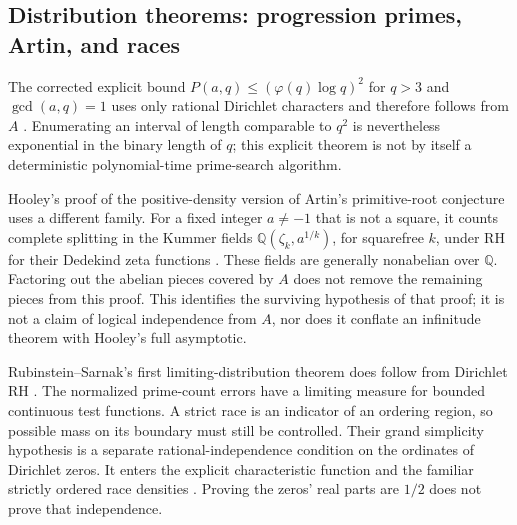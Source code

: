 \documentclass[11pt]{article}
\newcommand{\Q}{\mathbb Q}
\theoremstyle{definition}
\theoremstyle{remark}
\begin{document}
\subsection{Distribution theorems: progression primes, Artin, and races}

The corrected explicit bound
$P(a,q)\le(\varphi(q)\log q)^2$ for $q>3$ and $\gcd(a,q)=1$ uses only rational Dirichlet
characters and therefore follows from $A$
\citep[Corollary~1.2, corrected author p.~3]{LLS2015}.
Enumerating an interval of length comparable to $q^2$ is nevertheless
exponential in the binary length of $q$; this explicit theorem is not by
itself a deterministic polynomial-time prime-search algorithm.

Hooley's proof of the positive-density version of Artin's primitive-root
conjecture uses a different family. For a fixed integer $a\ne-1$ that is not a square, it counts
complete splitting in the Kummer fields
$\Q(\zeta_k,a^{1/k})$, for squarefree $k$, under RH for their Dedekind
zeta functions \citep[translation pp.~40--45, 47]{Hooley1967}.
These fields are generally nonabelian over $\Q$. Factoring out the abelian
pieces covered by $A$ does not remove the remaining pieces from this proof.
This identifies the surviving hypothesis of that proof; it is not a claim
of logical independence from $A$, nor does it conflate an infinitude theorem
with Hooley's full asymptotic.

Rubinstein--Sarnak's first limiting-distribution theorem does follow from
Dirichlet RH \citep[Theorem~1.1, p.~174]{RubinsteinSarnak1994}.
The normalized prime-count errors have a limiting measure for bounded
continuous test functions. A strict race is an indicator of an ordering
region, so possible mass on its boundary must still be controlled.
Their grand simplicity hypothesis is a separate rational-independence
condition on the ordinates of Dirichlet zeros. It enters the explicit
characteristic function and the familiar strictly ordered race densities
\citep[pp.~176--177]{RubinsteinSarnak1994}.
Proving the zeros' real parts are $1/2$ does not prove that independence.
\end{document}
